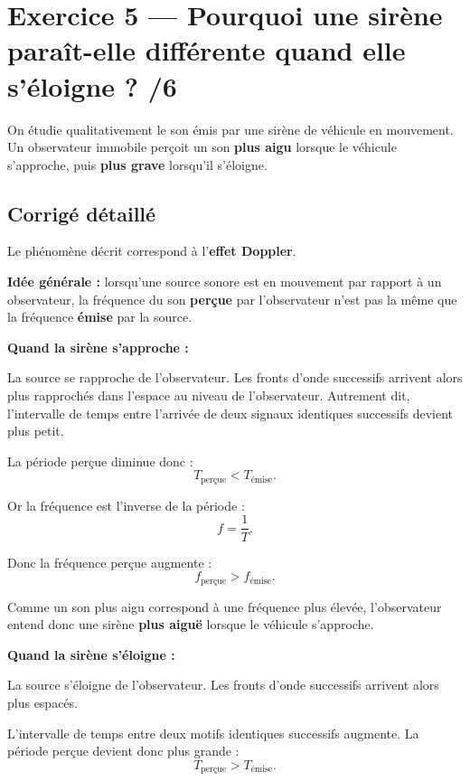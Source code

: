 \documentclass[11pt,a4paper]{article}
\begin{document}
\newpage
\section*{Exercice 5 --- Pourquoi une sirène paraît-elle différente quand elle s'éloigne ? \hfill /6}

On étudie qualitativement le son émis par une sirène de véhicule en mouvement.  
Un observateur immobile perçoit un son \textbf{plus aigu} lorsque le véhicule s'approche, puis \textbf{plus grave} lorsqu'il s'éloigne.

\subsection*{Corrigé détaillé}

Le phénomène décrit correspond à l'\textbf{effet Doppler}.

\medskip

\textbf{Idée générale :} lorsqu'une source sonore est en mouvement par rapport à un observateur, la fréquence du son \textbf{perçue} par l'observateur n'est pas la même que la fréquence \textbf{émise} par la source.

\medskip

\textbf{Quand la sirène s'approche :}

La source se rapproche de l'observateur. Les fronts d'onde successifs arrivent alors plus rapprochés dans l'espace au niveau de l'observateur.  
Autrement dit, l'intervalle de temps entre l'arrivée de deux signaux identiques successifs devient plus petit.

La période perçue diminue donc :
\[
T_{\text{perçue}} < T_{\text{émise}}.
\]

Or la fréquence est l'inverse de la période :
\[
f=\frac{1}{T}.
\]

Donc la fréquence perçue augmente :
\[
f_{\text{perçue}} > f_{\text{émise}}.
\]

Comme un son plus aigu correspond à une fréquence plus élevée, l'observateur entend donc une sirène \textbf{plus aiguë} lorsque le véhicule s'approche.

\medskip

\textbf{Quand la sirène s'éloigne :}

La source s'éloigne de l'observateur. Les fronts d'onde successifs arrivent alors plus espacés.

L'intervalle de temps entre deux motifs identiques successifs augmente. La période perçue devient donc plus grande :
\[
T_{\text{perçue}} > T_{\text{émise}}.
\]
\end{document}
